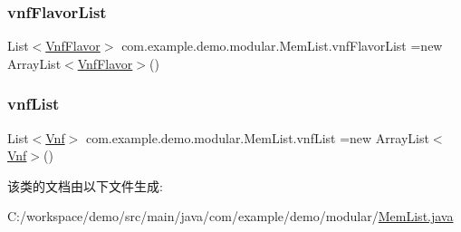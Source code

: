 \mbox{\label{classcom_1_1example_1_1demo_1_1modular_1_1_mem_list_a782b19767df77701d4664086e32b6dd7}} 
\subsubsection{\texorpdfstring{vnf\+Flavor\+List}{vnfFlavorList}}
{\footnotesize\ttfamily List$<$\mbox{\hyperlink{classcom_1_1example_1_1demo_1_1modular_1_1_vnf_flavor}{Vnf\+Flavor}}$>$ com.\+example.\+demo.\+modular.\+Mem\+List.\+vnf\+Flavor\+List =new Array\+List$<$\mbox{\hyperlink{classcom_1_1example_1_1demo_1_1modular_1_1_vnf_flavor}{Vnf\+Flavor}}$>$()}

\mbox{\label{classcom_1_1example_1_1demo_1_1modular_1_1_mem_list_ab447dbd3827648f735254d931c999da8}} 
\subsubsection{\texorpdfstring{vnf\+List}{vnfList}}
{\footnotesize\ttfamily List$<$\mbox{\hyperlink{classcom_1_1example_1_1demo_1_1modular_1_1_vnf}{Vnf}}$>$ com.\+example.\+demo.\+modular.\+Mem\+List.\+vnf\+List =new Array\+List$<$\mbox{\hyperlink{classcom_1_1example_1_1demo_1_1modular_1_1_vnf}{Vnf}}$>$()}



该类的文档由以下文件生成\+:\begin{DoxyCompactItemize}
\item 
C\+:/workspace/demo/src/main/java/com/example/demo/modular/\mbox{\hyperlink{_mem_list_8java}{Mem\+List.\+java}}\end{DoxyCompactItemize}

